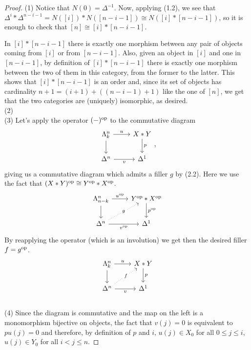 \documentclass[a4paper,11pt,openany]{scrartcl}
\begin{document}
\newpage
{}
\begin{proof}
    (1) Notice that $N(0)=\Delta^{-1}$. Now, applying (1.2), we see that
    $\Delta^i*\Delta^{n-i-1}=N([i])*N([n-i-1])\cong N([i]*[n-i-1])$, so it is
    enough to check that $[n]\cong [i]*[n-i-1]$.

    In $[i]*[n-i-1]$ there is exactly one morphism between any pair of objects
    coming from $[i]$ or from $[n-i-1]$. Also, given an object in $[i]$ and one
    in $[n-i-1]$, by definition of $[i]*[n-i-1]$ there is exactly one morphism
    between the two of them in this category, from the former to the latter.
    This shows that $[i]*[n-i-1]$ is an order and, since its set of objects has
    cardinality $n+1=(i+1)+((n-i-1)+1)$ like the one of $[n]$, we get that the
    two categories are (uniquely) isomorphic, as desired. \\

    (2) \\

    (3) Let's apply the operator $(-)^{\operatorname{op}}$ to the commutative diagram
    \[\begin{tikzcd}
	{\Lambda^n_k} & {X*Y} \\
	{\Delta^n} & {\Delta^1}
	\arrow["{u}", from=1-1, to=1-2]
	\arrow["{v}"', from=2-1, to=2-2]
	\arrow[from=1-1, to=2-1]
	\arrow["{p}", from=1-2, to=2-2]
    \end{tikzcd},\]
    giving us a commutative diagram which admits a filler $g$ by (2.2). Here we
    use the fact that $(X*Y)^{\operatorname{op}}\cong Y^{\operatorname{op}}*X^{\operatorname{op}}$.
    \[\begin{tikzcd}
	{\Lambda^n_{n-k}} & {Y^{\op}*X^{\op}} \\
	{\Delta^n} & {\Delta^1}
	\arrow["{u^{\op}}", from=1-1, to=1-2]
	\arrow["{v^{\op}}"', from=2-1, to=2-2]
	\arrow[from=1-1, to=2-1]
	\arrow["{p^{\op}}", from=1-2, to=2-2]
	\arrow["{g}" description, from=2-1, to=1-2, dotted]
    \end{tikzcd}\]
    By reapplying the operator (which is an involution) we get then the desired
    filler $f=g^{\operatorname{op}}$.
    \[\begin{tikzcd}
	{\Lambda^n_k} & {X*Y} \\
	{\Delta^n} & {\Delta^1}
	\arrow["{u}", from=1-1, to=1-2]
	\arrow["{v}"', from=2-1, to=2-2]
	\arrow[from=1-1, to=2-1]
	\arrow["{p}", from=1-2, to=2-2]
	\arrow["{f}" description, from=2-1, to=1-2, dotted]
    \end{tikzcd}\] \\

    (4) Since the diagram is commutative and the map on the left is a
    monomorphism bijective on objects, the fact that $v(j)=0$ is equivalent
    to $pu(j)=0$ and therefore, by definition of $p$ and $i$, $u(j)\in X_0$ for
    all $0\leq j\leq i$, $u(j)\in Y_0$ for all $i<j\leq n$.


\end{proof}
\end{document}
